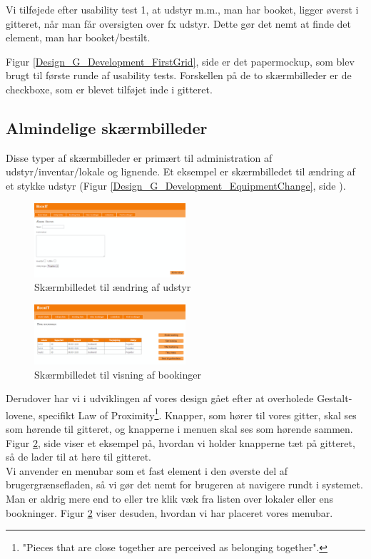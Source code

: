 Vi tilføjede efter usability test 1, at udstyr m.m., man har booket, ligger øverst i gitteret, når man får oversigten over fx udstyr. Dette gør det nemt at finde det element, man har booket/bestilt.

Figur \ref{Design_G_Development_FirstGrid}, side \pageref{Design_G_Development_FirstGrid} er det papermockup, som blev brugt til første runde af usability tests. Forskellen på de to skærmbilleder er de checkboxe, som er blevet tilføjet inde i gitteret. 

\subsection{Almindelige skærmbilleder}
\label{Design_G_Development_NormalWindows}
Disse typer af skærmbilleder er primært til administration af udstyr/inventar/lokale og lignende. Et eksempel er skærmbilledet til ændring af et stykke udstyr (Figur \ref{Design_G_Development_EquipmentChange}, side \pageref{Design_G_Development_EquipmentChange}). 

\begin{figure}[h!]
  \centering
    \includegraphics[width=0.5\textwidth]{Appendix/GUI-Prototype/DigitalMockup/AendreUdstyr}
  \caption{Skærmbilledet til ændring af udstyr}
\label{Design_G_Development_EquipmentChangeV1}
\end{figure} 

\begin{figure}[h!]
  \centering
    \includegraphics[width=0.5\textwidth]{Appendix/GUI-Prototype/DigitalMockup/DineBookinger}
  \caption{Skærmbilledet til visning af bookinger}
\label{Design_G_Development_YourBookings}
\end{figure} 

Derudover har vi i udviklingen af vores design gået efter at overholede Gestalt-lovene\cite[s. 68]{SL_UID}, specifikt Law of Proximity\footnote{"Pieces that are close together are perceived as belonging together".}. Knapper, som hører til vores gitter, skal ses som hørende til gitteret, og knapperne i menuen skal ses som hørende sammen. Figur \ref{Design_G_Development_YourBookings}, side \pageref{Design_G_Development_YourBookings} viser et eksempel på, hvordan vi holder knapperne tæt på gitteret, så de lader til at høre til gitteret.
\\Vi anvender en menubar som et fast element i den øverste del af brugergrænsefladen, så vi gør det nemt for brugeren at navigere rundt i systemet. Man er aldrig mere end to eller tre klik væk fra listen over lokaler eller ens bookninger. Figur \ref{Design_G_Development_YourBookings} viser desuden, hvordan vi har placeret vores menubar.